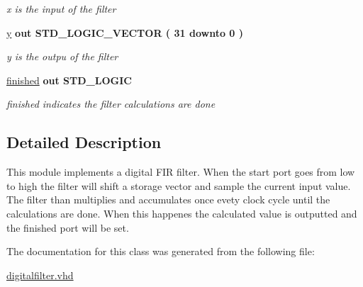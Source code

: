 \begin{DoxyCompactItemize}
\begin{DoxyCompactList}\small\item\em x is the input of the filter \end{DoxyCompactList}\item 
\hypertarget{classdigitalfilter_af668726c6bb16ef4d276739c4c161217}{\hyperlink{classdigitalfilter_af668726c6bb16ef4d276739c4c161217}{y}  {\bfseries {\bfseries \textcolor{vhdlkeyword}{out}\textcolor{vhdlchar}{ }}} {\bfseries \textcolor{comment}{S\-T\-D\-\_\-\-L\-O\-G\-I\-C\-\_\-\-V\-E\-C\-T\-O\-R}\textcolor{vhdlchar}{ }\textcolor{vhdlchar}{(}\textcolor{vhdlchar}{ }\textcolor{vhdlchar}{ } \textcolor{vhdldigit}{31} \textcolor{vhdlchar}{ }\textcolor{vhdlchar}{ }\textcolor{vhdlchar}{ }\textcolor{vhdlkeyword}{downto}\textcolor{vhdlchar}{ }\textcolor{vhdlchar}{ }\textcolor{vhdlchar}{ } \textcolor{vhdldigit}{0} \textcolor{vhdlchar}{ }\textcolor{vhdlchar}{)}\textcolor{vhdlchar}{ }} }\label{classdigitalfilter_af668726c6bb16ef4d276739c4c161217}

\begin{DoxyCompactList}\small\item\em y is the outpu of the filter \end{DoxyCompactList}\item 
\hypertarget{classdigitalfilter_ad2b5eab2bb63ad6b267ff2523ac34898}{\hyperlink{classdigitalfilter_ad2b5eab2bb63ad6b267ff2523ac34898}{finished}  {\bfseries {\bfseries \textcolor{vhdlkeyword}{out}\textcolor{vhdlchar}{ }}} {\bfseries \textcolor{comment}{S\-T\-D\-\_\-\-L\-O\-G\-I\-C}\textcolor{vhdlchar}{ }} }\label{classdigitalfilter_ad2b5eab2bb63ad6b267ff2523ac34898}

\begin{DoxyCompactList}\small\item\em finished indicates the filter calculations are done \end{DoxyCompactList}\end{DoxyCompactItemize}


\subsection{Detailed Description}
This module implements a digital F\-I\-R filter. When the start port goes from low to high the filter will shift a storage vector and sample the current input value. The filter than multiplies and accumulates once evety clock cycle until the calculations are done. When this happenes the calculated value is outputted and the finished port will be set. 

The documentation for this class was generated from the following file\-:\begin{DoxyCompactItemize}
\item 
\hyperlink{digitalfilter_8vhd}{digitalfilter.\-vhd}\end{DoxyCompactItemize}
